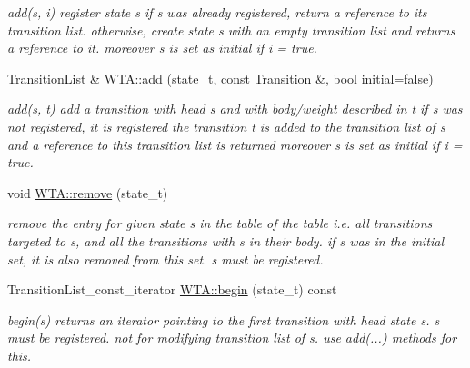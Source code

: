 \begin{DoxyCompactItemize}
\begin{DoxyCompactList}\small\item\em add(s, i) register state s if s was already registered, return a reference to its transition list. otherwise, create state s with an empty transition list and returns a reference to it. moreover s is set as initial if i = true. \end{DoxyCompactList}\item 
\mbox{\hyperlink{classTransitionList}{Transition\+List}} \& \mbox{\hyperlink{group__schemata_ga01de1e03d09518b38ab69a2075276ae2}{W\+T\+A\+::add}} (state\+\_\+t, const \mbox{\hyperlink{classTransition}{Transition}} \&, bool \mbox{\hyperlink{classWTA_ae6b10f70925f14f36b839e5d8657bc5e}{initial}}=false)
\begin{DoxyCompactList}\small\item\em add(s, t) add a transition with head s and with body/weight described in t if s was not registered, it is registered the transition t is added to the transition list of s and a reference to this transition list is returned moreover s is set as initial if i = true. \end{DoxyCompactList}\item 
\mbox{\label{group__schemata_ga3d8d24249e26ecc8bbdaf672c6e8d3cf}} 
void \mbox{\hyperlink{group__schemata_ga3d8d24249e26ecc8bbdaf672c6e8d3cf}{W\+T\+A\+::remove}} (state\+\_\+t)
\begin{DoxyCompactList}\small\item\em remove the entry for given state s in the table of the table i.\+e. all transitions targeted to s, and all the transitions with s in their body. if s was in the initial set, it is also removed from this set. s must be registered. \end{DoxyCompactList}\item 
\mbox{\label{group__schemata_ga23c3f9884c683e4bbab323208e08c672}} 
Transition\+List\+\_\+const\+\_\+iterator \mbox{\hyperlink{group__schemata_ga23c3f9884c683e4bbab323208e08c672}{W\+T\+A\+::begin}} (state\+\_\+t) const
\begin{DoxyCompactList}\small\item\em begin(s) returns an iterator pointing to the first transition with head state s. s must be registered. not for modifying transition list of s. use add(...) methods for this. \end{DoxyCompactList}\item 

\end{DoxyCompactItemize}
